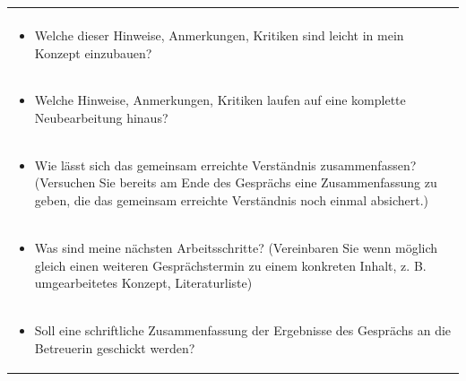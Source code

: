 \documentclass[]{book}
\providecommand{\tightlist}{%
  \setlength{\itemsep}{0pt}\setlength{\parskip}{0pt}}
\theoremstyle{definition}
\theoremstyle{definition}
\theoremstyle{definition}
\theoremstyle{remark}
\begin{document}
\begin{longtable}[]{@{}l@{}}
\begin{minipage}[t]{0.97\columnwidth}
\begin{itemize}
\end{itemize}\strut
\end{minipage}\tabularnewline
\begin{minipage}[t]{0.97\columnwidth}\raggedright\strut
\begin{itemize}
\tightlist
\item
  Welche dieser Hinweise, Anmerkungen, Kritiken sind leicht in mein
  Konzept einzubauen?\vspace{-6mm}
\end{itemize}\strut
\end{minipage}\tabularnewline
\begin{minipage}[t]{0.97\columnwidth}\raggedright\strut
\begin{itemize}
\tightlist
\item
  Welche Hinweise, Anmerkungen, Kritiken laufen auf eine komplette
  Neubearbeitung hinaus?\vspace{-6mm}
\end{itemize}\strut
\end{minipage}\tabularnewline
\begin{minipage}[t]{0.97\columnwidth}\raggedright\strut
\begin{itemize}
\tightlist
\item
  Wie lässt sich das gemeinsam erreichte Verständnis zusammenfassen?
  (Versuchen Sie bereits am Ende des Gesprächs eine Zusammenfassung zu
  geben, die das gemeinsam erreichte Verständnis noch einmal
  absichert.)\vspace{-6mm}
\end{itemize}\strut
\end{minipage}\tabularnewline
\begin{minipage}[t]{0.97\columnwidth}\raggedright\strut
\begin{itemize}
\tightlist
\item
  Was sind meine nächsten Arbeitsschritte? (Vereinbaren Sie wenn möglich
  gleich einen weiteren Gesprächstermin zu einem konkreten Inhalt, z. B.
  umgearbeitetes Konzept, Literaturliste)\vspace{-6mm}
\end{itemize}\strut
\end{minipage}\tabularnewline
\begin{minipage}[t]{0.97\columnwidth}\raggedright\strut
\begin{itemize}
\tightlist
\item
  Soll eine schriftliche Zusammenfassung der Ergebnisse des Gesprächs an
  die Betreuerin geschickt werden?
\end{itemize}\strut
\end{minipage}\tabularnewline
\bottomrule
\end{longtable}
\end{document}
